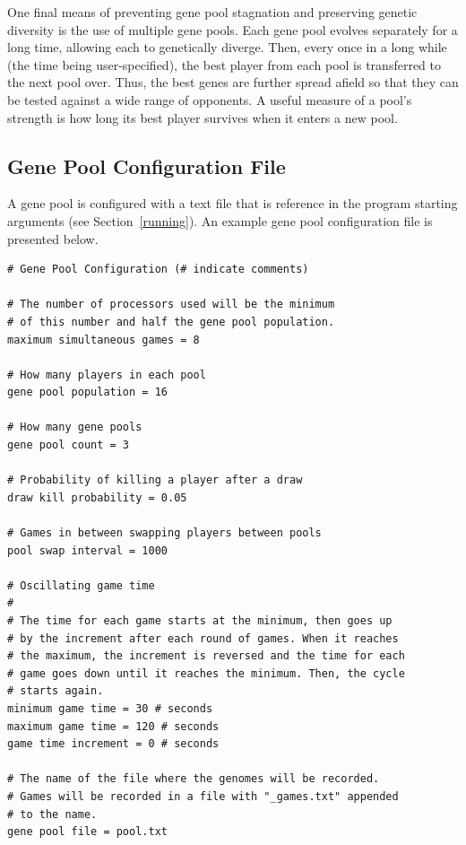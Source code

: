 \documentclass[letterpaper]{article}
\renewcommand\_{\textunderscore\allowbreak}
\begin{document}
One final means of preventing gene pool stagnation and preserving genetic diversity is the use of multiple gene pools. Each gene pool evolves separately for a long time, allowing each to genetically diverge. Then, every once in a long while (the time being user-specified), the best player from each pool is transferred to the next pool over. Thus, the best genes are further spread afield so that they can be tested against a wide range of opponents. A useful measure of a pool's strength is how long its best player survives when it enters a new pool.

\subsection{Gene Pool Configuration File}
A gene pool is configured with a text file that is reference in the program starting arguments (see Section~\ref{running}). An example gene pool configuration file is presented below.
\begin{verbatim}
# Gene Pool Configuration (# indicate comments)

# The number of processors used will be the minimum
# of this number and half the gene pool population.
maximum simultaneous games = 8

# How many players in each pool
gene pool population = 16

# How many gene pools
gene pool count = 3

# Probability of killing a player after a draw
draw kill probability = 0.05

# Games in between swapping players between pools
pool swap interval = 1000

# Oscillating game time
#
# The time for each game starts at the minimum, then goes up
# by the increment after each round of games. When it reaches
# the maximum, the increment is reversed and the time for each
# game goes down until it reaches the minimum. Then, the cycle
# starts again.
minimum game time = 30 # seconds
maximum game time = 120 # seconds
game time increment = 0 # seconds

# The name of the file where the genomes will be recorded.
# Games will be recorded in a file with "_games.txt" appended
# to the name.
gene pool file = pool.txt
\end{verbatim}
\end{document}
